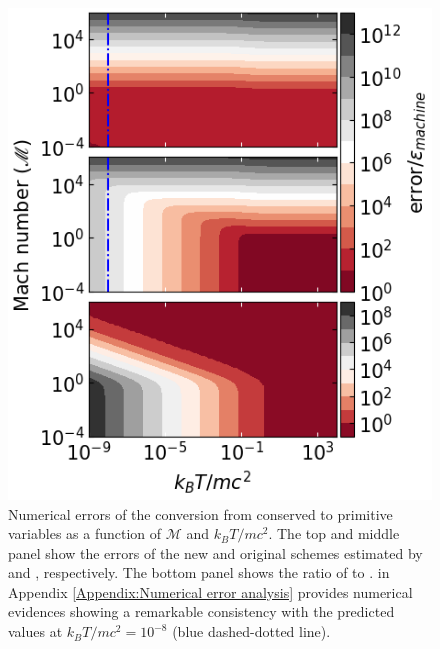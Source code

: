 \begin{figure}
	\includegraphics[width=\columnwidth]{figures/ErrorDistributionImproved.png}
    \caption{Numerical errors of the conversion from conserved to primitive variables as a function of $\mathscr{M}$ and $k_{B}T/mc^2$. The top and middle panel show the errors of the new and original schemes estimated by  and , respectively. The bottom panel shows the ratio of  to .  in Appendix \ref{Appendix:Numerical error analysis} provides numerical evidences showing a remarkable consistency with the predicted values at $k_{B}T/mc^2=10^{-8}$ (blue dashed-dotted line).}
   \label{fig:ErrorDistribution}
\end{figure}

